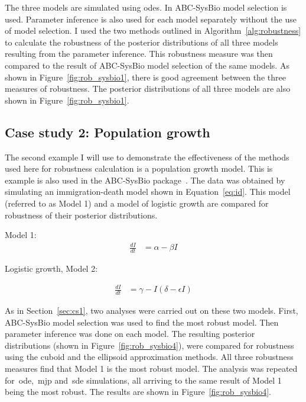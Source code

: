 \noindent The three models are simulated using \acrshort{ode}s. In ABC-SysBio model selection is used. Parameter inference is also used for each model separately without the use of model selection. I used the two methods outlined in Algorithm~\ref{alg:robustness} to calculate the robustness of the posterior distributions of all three models resulting from the parameter inference. This robustness measure was then compared to the result of ABC-SysBio model selection of the same models. As shown in Figure~\ref{fig:rob_sysbio1}, there is good agreement between the three measures of robustness. The posterior distributions of all three models are also shown in Figure~\ref{fig:rob_sysbio1}.

\subsection{Case study 2: Population growth}
\label{sec:cs2}
The second example I will use to demonstrate the effectiveness of the methods used here for robustness calculation is a population growth model. This is example is also used in the ABC-SysBio package~\autocite{Toni:2009tr}. The data was obtained by simulating an immigration-death model shown in Equation~\ref{eq:id}. This model (referred to as Model 1) and a model of logistic growth are compared for robustness of their posterior distributions.
 
\noindent Model 1:
\begin{align}
  \frac{dI}{dt} &= \alpha - \beta I \label{eq:id}
\end{align}

\noindent Logistic growth, Model 2:

\begin{align}
  \frac{dI}{dt} &= \gamma - I	(\delta - \epsilon I)
\end{align}


\noindent As in Section~\ref{sec:cs1}, two analyses were carried out on these two models. First, ABC-SysBio model selection was used to find the most robust model. Then parameter inference was done on each model. The resulting posterior distributions (shown in Figure~\ref{fig:rob_sysbio4}), were compared for robustness using the cuboid and the ellipsoid approximation methods. All three robustness measures find that Model 1 is the most robust model. The analysis was repeated for~\acrshort{ode},~\acrfull{mjp} and~\acrfull{sde} simulations, all arriving to the same result of Model 1 being the most robust. The results are shown in Figure~\ref{fig:rob_sysbio4}.


